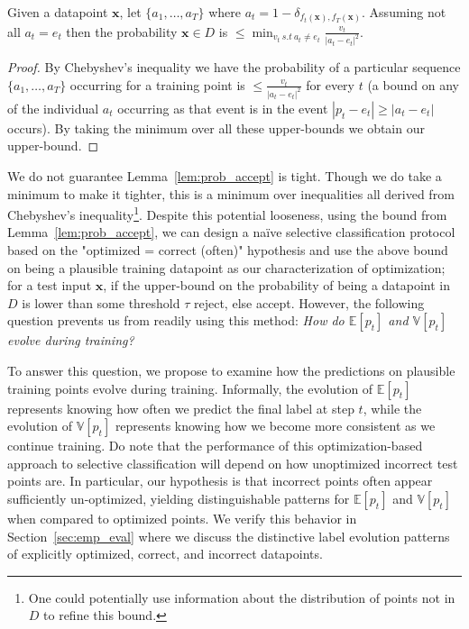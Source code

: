 \begin{lemma}
\label{lem:prob_accept}
Given a datapoint $\bm{x}$,  let $\{a_1,\ldots,a_T\}$ where $a_t = 1- \delta_{f_t(\bm{x}),f_T(\bm{x})}$. Assuming not all $a_t = e_t$ then the probability $\bm{x} \in D$ is  $\leq \min_{v_t~s.t~a_t \neq e_t}  \frac{v_t}{|a_t - e_t|^2}$.
\end{lemma}
\begin{proof}
By Chebyshev's inequality we have the probability of a particular sequence $\{a_1,\ldots,a_T\}$ occurring for a training point is $\leq \frac{v_t}{|a_t - e_t|^2}$ for every $t$ (a bound on any of the individual $a_t$ occurring as that event is in the event $|p_t - e_t| \geq |a_t - e_t|$ occurs). By taking the minimum over all these upper-bounds we obtain our upper-bound.
\end{proof}

We do not guarantee Lemma~\ref{lem:prob_accept} is tight. Though we do take a minimum to make it tighter, this is a minimum over inequalities all derived from Chebyshev's inequality\footnote{One could potentially use information about the distribution of points not in $D$ to refine this bound.}. Despite this potential looseness, using the bound from Lemma~\ref{lem:prob_accept}, we can design a na\"ive selective classification protocol based on the "optimized = correct (often)" hypothesis and use the above bound on being a plausible training datapoint as our characterization of optimization; for a test input $\bm{x}$, if the upper-bound on the probability of being a datapoint in $D$ is lower than some threshold $\tau$ reject, else accept. However, the following question prevents us from readily using this method: \emph{How do $\mathbb{E}[p_{t}]$ and $\mathbb{V}[p_{t}]$ evolve during training?}

To answer this question, we propose to examine how the predictions on plausible training points evolve during training. Informally, the evolution of $\mathbb{E}[p_{t}]$ represents knowing how often we predict the final label at step $t$, while the evolution of $\mathbb{V}[p_{t}]$ represents knowing how we become more consistent as we continue training. Do note that the performance of this optimization-based approach to selective classification will depend on how unoptimized incorrect test points are. In particular, our hypothesis is that incorrect points often appear sufficiently un-optimized, yielding distinguishable patterns for $\mathbb{E}[p_{t}]$ and $\mathbb{V}[p_{t}]$ when compared to optimized points. We verify this behavior in Section~\ref{sec:emp_eval} where we discuss the distinctive label evolution patterns of explicitly optimized, correct, and incorrect datapoints.

